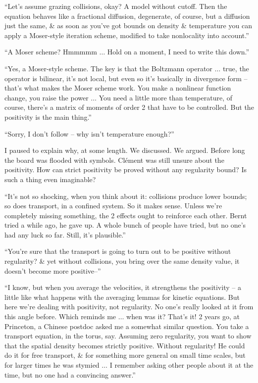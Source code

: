 \documentclass{article}
\numberwithin{equation}{section}
\begin{document}
``Let's assume grazing collisions, okay? A model without cutoff. Then the equation behaves like a fractional diffusion, degenerate, of course, but a diffusion just the same, \& as soon as you've got bounds on density \& temperature you can apply a Moser-style iteration scheme, modified to take nonlocality into account.''

``A Moser scheme? Hmmmmm $\ldots$ Hold on a moment, I need to write this down.''

``Yes, a Moser-style scheme. The key is that the Boltzmann operator $\ldots$ true, the operator is bilinear, it's not local, but even so it's basically in divergence form -- that's what makes the Moser scheme work. You make a nonlinear function change, you raise the power $\ldots$ You need a little more than temperature, of course, there's a matrix of moments of order 2 that have to be controlled. But the positivity is the main thing.''

``Sorry, I don't follow -- why isn't temperature enough?''

I paused to explain why, at some length. We discussed. We argued. Before long the board was flooded with symbols. Cl\'ement was still unsure about the positivity. How can strict positivity be proved without any regularity bound? Is such a thing even imaginable?

``It's not so shocking, when you think about it: collisions produce lower bounds; so does transport, in a confined system. So it makes sense. Unless we're completely missing something, the 2 effects ought to reinforce each other. Bernt tried a while ago, he gave up. A whole bunch of people have tried, but no one's had any luck so far. Still, it's plausible.''

``You're sure that the transport is going to turn out to be positive without regularity? \& yet without collisions, you bring over the same density value, it doesn't become more positive--''

``I know, but when you average the velocities, it strengthens the positivity -- a little like what happens with the averaging lemmas for kinetic equations. But here we're dealing with positivity, not regularity. No one's really looked at it from this angle before. Which reminds me $\ldots$ when was it? That's it! 2 years go, at Princeton, a Chinese postdoc asked me a somewhat similar question. You take a transport equation, in the torus, say. Assuming zero regularity, you want to show that the spatial density becomes strictly positive. Without regularity! He could do it for free transport, \& for something more general on small time scales, but for larger times he was stymied $\ldots$ I remember asking other people about it at the time, but no one had a convincing answer.''
\end{document}
